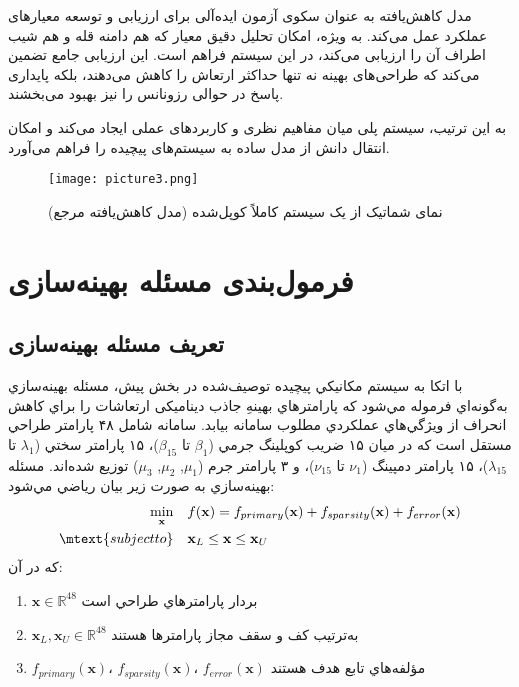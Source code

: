مدل کاهش‌یافته به عنوان سکوی آزمون ایده‌آلی برای ارزیابی و توسعه معیارهای عملکرد عمل می‌کند. به ویژه، امکان تحلیل دقیق معیار  که هم دامنه قله و هم شیب اطراف آن را ارزیابی می‌کند، در این سیستم فراهم است. این ارزیابی جامع تضمین می‌کند که طراحی‌های بهینه نه تنها حداکثر ارتعاش را کاهش می‌دهند، بلکه پایداری پاسخ در حوالی رزونانس را نیز بهبود می‌بخشند.

به این ترتیب، سیستم  پلی میان مفاهیم نظری و کاربردهای عملی ایجاد می‌کند و امکان انتقال دانش از مدل ساده به سیستم‌های پیچیده را فراهم می‌آورد.
\begin{figure}[H]
\centering
\texttt{[image: picture3.png]}
\caption{نمای شماتیک از یک سیستم کاملاً کوپل‌شده  (مدل کاهش‌یافته مرجع)}
\label{fig:fully-coupled-1dof}
\end{figure}

\section{فرمول‌بندی مسئله بهینه‌سازی}
\subsection{تعریف مسئله بهینه‌سازی}
با اتکا به سيستم مكانيكي پيچيده  توصيف‌شده در بخش پيش، مسئله بهينه‌سازي به‌گونه‌اي فرموله مي‌شود كه پارامترهاي بهينهِ جاذب دینامیکی ارتعاشات را براي كاهش انحراف از ويژگي‌هاي عملكردي مطلوب سامانه بيابد. سامانه شامل ۴۸ پارامتر طراحي مستقل است كه در ميان ۱۵ ضريب كوپلينگ جرمي ($\beta_1$ تا $\beta_{15}$)، ۱۵ پارامتر سختي ($\lambda_1$ تا $\lambda_{15}$)، ۱۵ پارامتر دمپينگ ($\nu_1$ تا $\nu_{15}$)، و ۳ پارامتر جرم  ($\mu_1$, $\mu_2$, $\mu_3$) توزيع شده‌اند.
مسئله بهينه‌سازي به صورت زير بيان رياضي مي‌شود:
\begin{equation}\label{Eq.optimization_problem}
\begin{aligned}
\min_{\mathbf{x}} \quad & f(\mathbf{x}) = f_{primary}(\mathbf{x}) + f_{sparsity}(\mathbf{x}) + f_{error}(\mathbf{x}) \\
\mtext{subject to} \quad & \mathbf{x}_L \leq \mathbf{x} \leq \mathbf{x}_U \\
\end{aligned}
\end{equation}
كه در آن:
\begin{enumerate}
    \item $\mathbf{x} \in \mathbb{R}^{48}$ بردار پارامترهاي طراحي است
    \item $\mathbf{x}_L, \mathbf{x}_U \in \mathbb{R}^{48}$ به‌ترتيب كف و سقف مجاز پارامترها هستند
    \item $f_{primary}(\mathbf{x})$، $f_{sparsity}(\mathbf{x})$، $f_{error}(\mathbf{x})$ مؤلفه‌هاي تابع هدف هستند
\end{enumerate}

